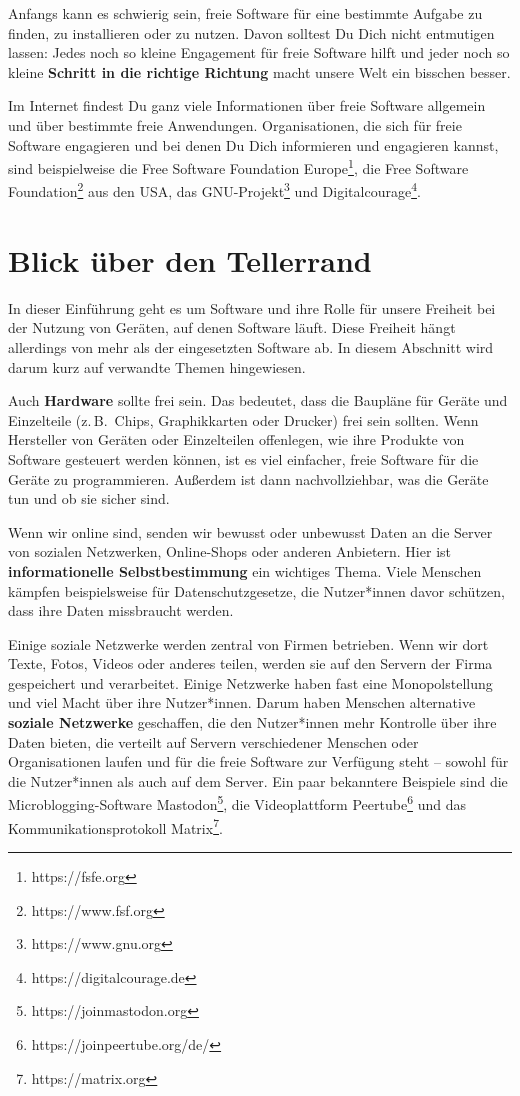 \documentclass[a5paper,12pt]{scrartcl}
\begin{document}
Anfangs kann es schwierig sein, freie Software für eine bestimmte
Aufgabe zu finden, zu installieren oder zu nutzen. Davon solltest Du
Dich nicht entmutigen lassen: Jedes noch so kleine Engagement für
freie Software hilft und jeder noch so kleine \textbf{Schritt in die
  richtige Richtung} macht unsere Welt ein bisschen besser.

Im Internet findest Du ganz viele Informationen über freie Software
allgemein und über bestimmte freie Anwendungen. Organisationen, die
sich für freie Software engagieren und bei denen Du Dich informieren
und engagieren kannst, sind beispielweise die Free Software Foundation
Europe\footnote{https://fsfe.org}, die Free Software
Foundation\footnote{https://www.fsf.org} aus den USA, das
GNU-Projekt\footnote{https://www.gnu.org} und
Digitalcourage\footnote{https://digitalcourage.de}.


\section{Blick über den Tellerrand}

In dieser Einführung geht es um Software und ihre Rolle für unsere
Freiheit bei der Nutzung von Geräten, auf denen Software läuft. Diese
Freiheit hängt allerdings von mehr als der eingesetzten Software
ab. In diesem Abschnitt wird darum kurz auf verwandte Themen
hingewiesen.

Auch \textbf{Hardware} sollte frei sein. Das bedeutet, dass die
Baupläne für Geräte und Einzelteile (z.\,B.\ Chips, Graphikkarten oder
Drucker) frei sein sollten. Wenn Hersteller von Geräten oder
Einzelteilen offenlegen, wie ihre Produkte von Software gesteuert
werden können, ist es viel einfacher, freie Software für die Geräte zu
programmieren. Außerdem ist dann nachvollziehbar, was die Geräte tun
und ob sie sicher sind.

Wenn wir online sind, senden wir bewusst oder unbewusst Daten an die
Server von sozialen Netzwerken, Online-Shops oder anderen
Anbietern. Hier ist \textbf{informationelle Selbstbestimmung} ein
wichtiges Thema. Viele Menschen kämpfen beispielsweise für
Datenschutzgesetze, die Nutzer*innen davor schützen, dass ihre Daten
missbraucht werden.

Einige soziale Netzwerke werden zentral von Firmen betrieben. Wenn wir
dort Texte, Fotos, Videos oder anderes teilen, werden sie auf den
Servern der Firma gespeichert und verarbeitet. Einige Netzwerke haben
fast eine Monopolstellung und viel Macht über ihre Nutzer*innen. Darum
haben Menschen alternative \textbf{soziale Netzwerke} geschaffen, die
den Nutzer*innen mehr Kontrolle über ihre Daten bieten, die verteilt
auf Servern verschiedener Menschen oder Organisationen laufen und für
die freie Software zur Verfügung steht -- sowohl für die Nutzer*innen
als auch auf dem Server. Ein paar bekanntere Beispiele sind die
Microblogging-Software Mastodon\footnote{https://joinmastodon.org},
die Videoplattform Peertube\footnote{https://joinpeertube.org/de/} und
das Kommunikationsprotokoll Matrix\footnote{https://matrix.org}.
\end{document}
